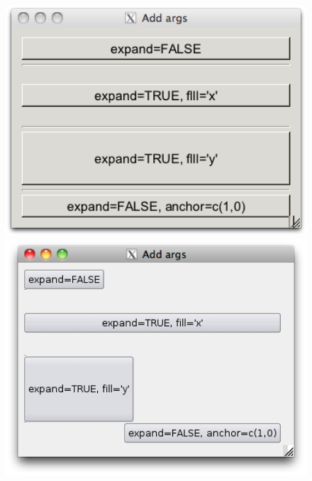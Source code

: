\begin{figure}
  \centering
  \begin{minipage}[c]{.32\linewidth}
    \includegraphics[width=1\textwidth]{fig-gWidgets-expand-RGtk2.png}    
  \end{minipage}
  \begin{minipage}[c]{.32\linewidth}
    \includegraphics[width=1\textwidth]{fig-gWidgets-expand-tcltk.png}    
  \end{minipage}
  \begin{minipage}[c]{.32\linewidth}

\end{minipage}
\end{figure}
